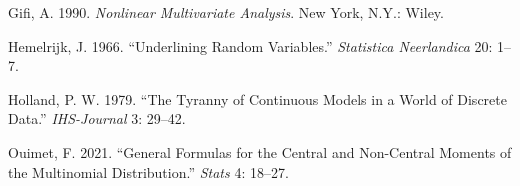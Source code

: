 \documentclass[
  12pt,
  letterpaper,
  DIV=11,
  numbers=noendperiod]{scrartcl}
\newlength{\cslhangindent}
\newenvironment{CSLReferences}[2] %
 {\begin{list}{}{%
  \setlength{\itemindent}{0pt}
  \setlength{\leftmargin}{0pt}
  \setlength{\parsep}{0pt}
  \ifodd #1
   \setlength{\leftmargin}{\cslhangindent}
   \setlength{\itemindent}{-1\cslhangindent}
  \fi
  \setlength{\itemsep}{#2\baselineskip}}}
 {\end{list}}
\begin{document}
\label{refs}
\begin{CSLReferences}{1}{0}
Gifi, A. 1990. \emph{Nonlinear Multivariate Analysis}. New York, N.Y.:
Wiley.

Hemelrijk, J. 1966. {``{Underlining Random Variables}.''}
\emph{Statistica Neerlandica} 20: 1--7.

Holland, P. W. 1979. {``{The Tyranny of Continuous Models in a World of
Discrete Data}.''} \emph{IHS-Journal} 3: 29--42.

Ouimet, F. 2021. {``General Formulas for the Central and Non-Central
Moments of the Multinomial Distribution.''} \emph{Stats} 4: 18--27.

\end{CSLReferences}
\end{document}
